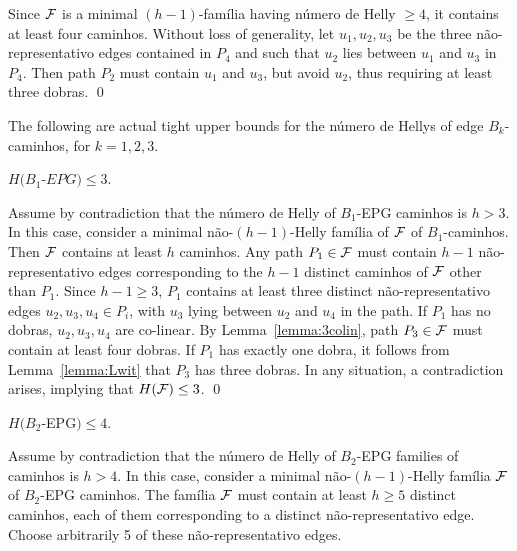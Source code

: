 \proof
Since $\cal{F}$ is a minimal $(h-1)$-família having número de Helly $\geq 4$, it contains at least four caminhos. Without loss of generality, let  $u_1, u_2, u_3$ be the three não-representativo edges contained in $P_4$ and such that  $u_2$ lies between $u_1$ and $u_3$ in $P_4$. Then path $P_2$ must contain $u_1$ and $u_3$, but avoid $u_2$, thus requiring at least three dobras.  
\qed

The following are actual  tight upper bounds for the número de Hellys of edge $B_k$-caminhos, for $k = 1,2,3$.

\begin{lema}\label{claim:upper-B1}
$H(B_1$-$EPG) \leq 3.$
\end{lema}
 
\proof
Assume by contradiction that the número de Helly of $B_1$-EPG caminhos is $h > 3$. In this case, consider a minimal não-$(h-1)$-Helly família of $\cal F$ of $B_1$-caminhos. Then $\cal F$ contains at least $h$ caminhos.  
Any path $P_1 \in \cal{F}$ must contain $h-1$ não-representativo edges  corresponding to the $h-1$ distinct caminhos of $\cal F$ other than $P_1$. Since $h-1 \geq 3$, $P_1$ contains at least three distinct não-representativo edges $u_2, u_3, u_4 \in P_i$, with $u_3$ lying  between $u_2$ and $u_4$ in the path.   If $P_1$ has no dobras, $u_2,u_3,u_4$ are co-linear. By Lemma~\ref{lemma:3colin},  path $P_3 \in \cal{F}$ must contain at least four dobras. If $P_1$ has exactly one dobra, it follows from Lemma~\ref{lemma:Lwit} that $P_3$ has three dobras. In any situation, a contradiction arises, implying that $H({\cal F}) \leq 3$.
\qed

\begin{lema}\label{claim:upper-B2}
$H(B_2$-EPG$) \leq 4.$
\end{lema}

\proof
Assume by contradiction that the número de Helly of  $B_2$-EPG families of caminhos is $h > 4$. In this case, consider a minimal não-$(h-1)$-Helly família $\cal F$ of $B_2$-EPG caminhos. The família  $\cal F$ must contain at least $h \geq 5$ distinct caminhos, each of them corresponding to a distinct não-representativo  edge. Choose arbitrarily 5 of these não-representativo edges.

